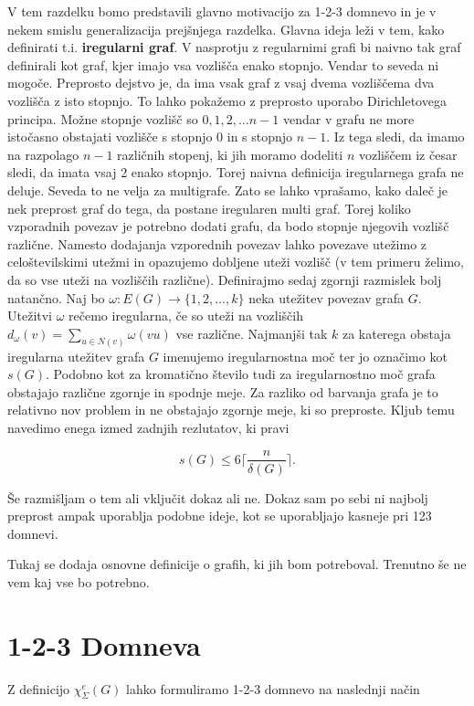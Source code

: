 \documentclass[12pt,a4paper,twoside]{article}
\theoremstyle{definition} %
\theoremstyle{plain} %
\newcommand{\ec}{\chi_{\Sigma}^e}
\numberwithin{equation}{section}  %
\begin{document}
V tem razdelku bomo predstavili glavno motivacijo za 1-2-3 domnevo in je v nekem smislu generalizacija prejšnjega razdelka. Glavna ideja leži v tem, kako definirati t.i. \textbf{iregularni graf}. V nasprotju z regularnimi grafi bi naivno tak graf definirali kot graf, kjer imajo vsa vozlišča enako stopnjo. Vendar to seveda ni mogoče. Preprosto dejstvo je, da ima vsak graf z vsaj dvema vozliščema dva vozlišča z isto stopnjo. To lahko pokažemo z preprosto uporabo Dirichletovega principa. Možne stopnje vozlišč so $0, 1, 2, \ldots n-1$ vendar v grafu ne more istočasno obstajati vozlišče s stopnjo $0$ in s stopnjo $n-1$. Iz tega sledi, da imamo na razpolago $n-1$ različnih stopenj, ki jih moramo dodeliti $n$ vozliščem iz česar sledi, da imata vsaj 2 enako stopnjo. Torej naivna definicija iregularnega grafa ne deluje. Seveda to ne velja za multigrafe. Zato se lahko vprašamo, kako daleč je nek preprost graf do tega, da postane iregularen multi graf. Torej koliko vzporadnih povezav je potrebno dodati grafu, da bodo stopnje njegovih vozlišč različne. Namesto dodajanja vzporednih povezav lahko povezave utežimo z celoštevilskimi utežmi in opazujemo dobljene uteži vozlišč (v tem primeru želimo, da so vse uteži na vozliščih različne). Definirajmo sedaj zgornji razmislek bolj natančno. Naj bo $\omega : E(G) \rightarrow \{1,2, \ldots, k\}$ neka utežitev povezav grafa $G$. Utežitvi $\omega$ rečemo iregularna, če so uteži na vozliščih $ d_{\omega}(v) =  \sum_{u \in N(v)} \omega(vu)$ vse različne. Najmanjši tak $k$ za katerega obstaja iregularna utežitev grafa $G$ imenujemo iregularnostna moč ter jo označimo kot $s(G)$. Podobno kot za kromatično število tudi za iregularnostno moč grafa obstajajo različne zgornje in spodnje meje. Za razliko od barvanja grafa je to relativno nov problem in ne obstajajo zgornje meje, ki so preproste. Kljub temu navedimo enega izmed zadnjih rezlutatov, ki pravi 

$$  s(G) \le 6 \lceil\frac{n}{\delta(G)}\rceil.$$

Še razmišljam o tem ali vključit dokaz ali ne.  Dokaz sam po sebi ni najbolj preprost ampak uporablja podobne ideje, kot se uporabljajo kasneje pri 123 domnevi.

Tukaj se dodaja osnovne definicije o grafih, ki jih bom potreboval. Trenutno še ne vem kaj vse bo potrebno.



\section{1-2-3 Domneva}
Z definicijo $\ec(G)$ lahko formuliramo 1-2-3 domnevo na naslednji način
\end{document}
